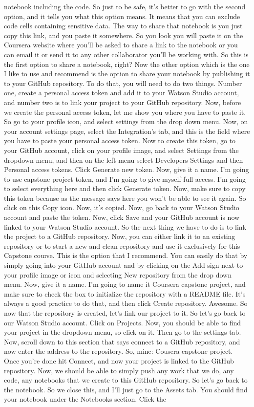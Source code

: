 notebook including the code. So just to be safe, it's better to go with the second option, and it tells you what this option means. It means that you can exclude code cells containing sensitive data. The way to share that notebook is you just copy this link, and you paste it somewhere. So you look you will paste it on the Coursera website where you'll be asked to share a link to the notebook or you can email it or send it to any other collaborator you'll be working with. So this is the first option to share a notebook, right? Now the other option which is the one I like to use and recommend is the option to share your notebook by publishing it to your GitHub repository. To do that, you will need to do two things. Number one, create a personal access token and add it to your Watson Studio account, and number two is to link your project to your GitHub repository. Now, before we create the personal access token, let me show you where you have to paste it. So go to your profile icon, and select settings from the drop down menu. Now, on your account settings page, select the Integration's tab, and this is the field where you have to paste your personal access token. Now to create this token, go to your GitHub account, click on your profile image, and select Settings from the dropdown menu, and then on the left menu select Developers Settings and then Personal access tokens. Click Generate new token. Now, give it a name. I'm going to use capstone project token, and I'm going to give myself full access. I'm going to select everything here and then click Generate token. Now, make sure to copy this token because as the message says here you won't be able to see it again. So click on this Copy icon. Now, it's copied. Now, go back to your Watson Studio account and paste the token. Now, click Save and your GitHub account is now linked to your Watson Studio account. So the next thing we have to do is to link the project to a GitHub repository. Now, you can either link it to an existing repository or to start a new and clean repository and use it exclusively for this Capstone course. This is the option that I recommend. You can easily do that by simply going into your GitHub account and by clicking on the Add sign next to your profile image or icon and selecting New repository from the drop down menu. Now, give it a name. I'm going to name it Coursera capstone project, and make sure to check the box to initialize the repository with a README file. It's always a good practice to do that, and then click Create repository. Awesome. So now that the repository is created, let's link our project to it. So let's go back to our Watson Studio account. Click on Projects. Now, you should be able to find your project in the dropdown menu, so click on it. Then go to the settings tab. Now, scroll down to this section that says connect to a GitHub repository, and now enter the address to the repository. So, mine: Cousera capstone project. Once you're done hit Connect, and now your project is linked to the GitHub repository. Now, we should be able to simply push any work that we do, any code, any notebooks that we create to this GitHub repository. So let's go back to the notebook. So we close this, and I'll just go to the Assets tab. You should find your notebook under the Notebooks section. Click the 
